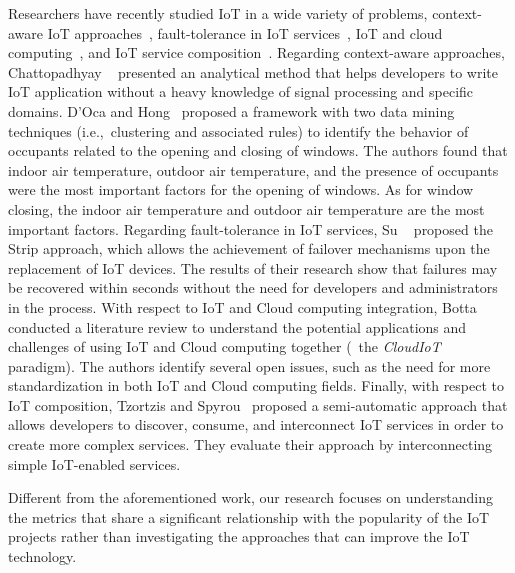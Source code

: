 Researchers have recently studied IoT in a wide variety of problems, \ie{}
context-aware IoT
approaches~\cite{chattopadhyay2015way,d2014data,nambi2014unified,jin2014information,perera2014context,bauman2014discovering,barnaghi2016searching,li2014qos},
fault-tolerance in IoT
services~\cite{su2014decentralized,reijers2013design,zhou2015supporting}, IoT
and cloud
computing~\cite{botta2014integration,kamilaris2011smart,rao2012cloud,fox2012architecture,zaslavsky2013sensing},
and IoT service
composition~\cite{florescu2003xl,billet2014task,hachem2011ontologies,alam2010senaas,tzortzis2016semi,de2012internet,zhang2017service,huang2015context,eisenhauer2010hydra,
	su2014decentralized,patel2015enabling}.
Regarding context-aware approaches, Chattopadhyay \etal~\cite{chattopadhyay2015way} presented an
analytical method that helps developers to write IoT application without a heavy
knowledge of signal processing and specific
domains. D'Oca and Hong~\cite{d2014data} proposed a
framework with two data mining techniques (i.e.,~clustering and associated
rules) to identify the behavior of occupants related to the opening and closing of windows. The
authors found that indoor air temperature, outdoor air temperature, and
the presence of occupants were the most important factors for the opening of windows. As 
for window closing, the indoor air temperature and outdoor air temperature
are the most important factors. Regarding fault-tolerance in IoT services, Su \etal~\cite{su2014decentralized} proposed the Strip approach, which allows the achievement of failover mechanisms upon the replacement of IoT devices. The results of their research show that failures may be recovered within seconds without the need for developers and administrators in
the process. With respect to IoT and Cloud computing
integration, Botta \etal~\cite{botta2014integration} conducted a literature
review to understand the potential applications and challenges of using IoT and
Cloud computing together (\ie~the {\em CloudIoT} paradigm). The authors
identify several open issues, such as the need for more standardization in both
IoT and Cloud computing fields. Finally, with respect to IoT composition,
Tzortzis and Spyrou~\cite{tzortzis2016semi} proposed a semi-automatic approach
that allows developers to discover, consume, and interconnect IoT services in
order to create more complex services. They evaluate their approach by
interconnecting simple IoT-enabled services.%

Different from the aforementioned work, our research focuses on understanding
the metrics that share a significant relationship with the popularity of the
IoT projects rather than investigating the approaches that can improve the IoT
technology.


